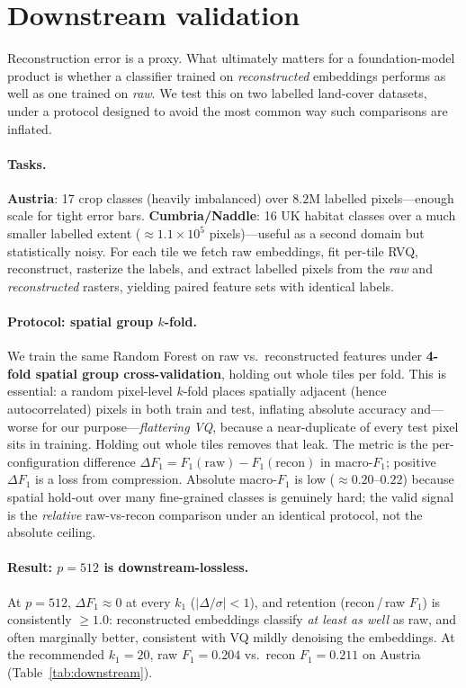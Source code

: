 \documentclass[11pt]{article}
\begin{document}
\section{Downstream validation}
\label{sec:downstream}

Reconstruction error is a proxy. What ultimately matters for a foundation-model
product is whether a classifier trained on \emph{reconstructed} embeddings
performs as well as one trained on \emph{raw}. We test this on two labelled
land-cover datasets, under a protocol designed to avoid the most common way such
comparisons are inflated.

\paragraph{Tasks.}
\textbf{Austria}: 17 crop classes (heavily imbalanced) over $8.2\mathrm{M}$
labelled pixels---enough scale for tight error bars. \textbf{Cumbria/Naddle}: 16
UK habitat classes over a much smaller labelled extent (${\approx}1.1\times10^5$
pixels)---useful as a second domain but statistically noisy. For each tile we
fetch raw embeddings, fit per-tile RVQ, reconstruct, rasterize the labels, and
extract labelled pixels from the \emph{raw} and \emph{reconstructed} rasters,
yielding paired feature sets with identical labels.

\paragraph{Protocol: spatial group $k$-fold.}
We train the same Random Forest \cite{breiman2001} on raw vs.\ reconstructed
features under \textbf{4-fold spatial group cross-validation}, holding out whole
tiles per fold. This is essential: a random pixel-level $k$-fold places
spatially adjacent (hence autocorrelated) pixels in both train and test,
inflating absolute accuracy and---worse for our purpose---\emph{flattering VQ},
because a near-duplicate of every test pixel sits in training. Holding out whole
tiles removes that leak. The metric is the per-configuration difference
$\Delta F_1 = F_1(\text{raw}) - F_1(\text{recon})$ in macro-$F_1$; positive
$\Delta F_1$ is a loss from compression. Absolute macro-$F_1$ is low
($\approx0.20$--$0.22$) because spatial hold-out over many fine-grained classes
is genuinely hard; the valid signal is the \emph{relative} raw-vs-recon
comparison under an identical protocol, not the absolute ceiling.

\paragraph{Result: $p=512$ is downstream-lossless.}
At $p=512$, $\Delta F_1\approx0$ at every $k_1$ ($|\Delta/\sigma|<1$), and
retention (recon\,/\,raw $F_1$) is consistently $\ge1.0$: reconstructed
embeddings classify \emph{at least as well} as raw, and often marginally better,
consistent with VQ mildly denoising the embeddings. At the recommended
$k_1=20$, raw $F_1=0.204$ vs.\ recon $F_1=0.211$ on Austria
(Table~\ref{tab:downstream}).
\end{document}

